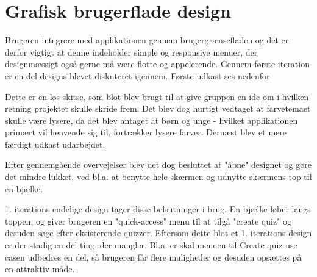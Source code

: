 \section{Grafisk brugerflade design}
Brugeren integrere med applikationen gennem brugergrænsefladen og det er derfor vigtigt at denne indeholder simple og responsive menuer, der designmæssigt også gerne må være flotte og appelerende.  
Gennem første iteration er en del designs blevet diskuteret igennem. Første udkast ses nedenfor. \\


Dette er en løs skitse, som blot blev brugt til at give gruppen en ide om i hvilken retning projektet skulle skride frem. Det blev dog hurtigt vedtaget at farvetemaet skulle være lysere, da det blev antaget at børn og unge - hvilket applikationen primært vil henvende sig til, fortrækker lysere farver.
Dernæst blev et mere færdigt udkast udarbejdet.\\ 



Efter gennemgående overvejelser blev det dog besluttet at "åbne" designet og gøre det mindre lukket, ved bl.a. at benytte hele skærmen og udnytte skærmens top til en bjælke. \\



1. iterations endelige design tager disse belsutninger i brug. En bjælke løber langs toppen, og giver brugeren en "quick-access" menu til at tilgå "create quiz" og desuden søge efter eksisterende quizzer. 
Eftersom dette blot et 1. iterations design er der stadig en del ting, der mangler. Bl.a. er skal menuen til Create-quiz use casen udbedres en del, så brugeren får flere muligheder og desuden opsættes på en attraktiv måde. 
